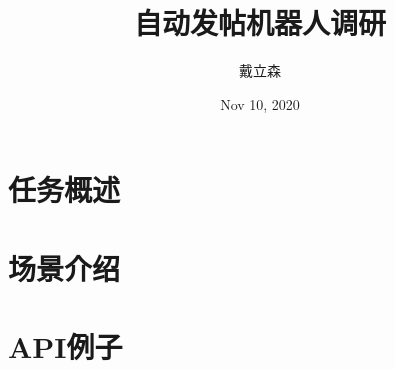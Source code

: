 \documentclass[10pt]{beamer}
\title{
    {自动发帖机器人调研}
}
\author{戴立森}
\date{Nov 10, 2020}
\begin{document}
    \maketitle
    \section*{任务概述}
    
    \section*{场景介绍}
    
    \section*{API例子}

        
\end{document}
